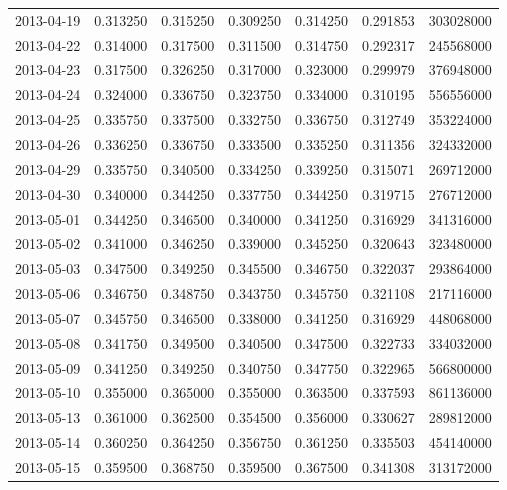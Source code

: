 \begin{tabular}{lrrrrrr}
2013-04-19 &    0.313250 &    0.315250 &    0.309250 &    0.314250 &    0.291853 &   303028000 \\
2013-04-22 &    0.314000 &    0.317500 &    0.311500 &    0.314750 &    0.292317 &   245568000 \\
2013-04-23 &    0.317500 &    0.326250 &    0.317000 &    0.323000 &    0.299979 &   376948000 \\
2013-04-24 &    0.324000 &    0.336750 &    0.323750 &    0.334000 &    0.310195 &   556556000 \\
2013-04-25 &    0.335750 &    0.337500 &    0.332750 &    0.336750 &    0.312749 &   353224000 \\
2013-04-26 &    0.336250 &    0.336750 &    0.333500 &    0.335250 &    0.311356 &   324332000 \\
2013-04-29 &    0.335750 &    0.340500 &    0.334250 &    0.339250 &    0.315071 &   269712000 \\
2013-04-30 &    0.340000 &    0.344250 &    0.337750 &    0.344250 &    0.319715 &   276712000 \\
2013-05-01 &    0.344250 &    0.346500 &    0.340000 &    0.341250 &    0.316929 &   341316000 \\
2013-05-02 &    0.341000 &    0.346250 &    0.339000 &    0.345250 &    0.320643 &   323480000 \\
2013-05-03 &    0.347500 &    0.349250 &    0.345500 &    0.346750 &    0.322037 &   293864000 \\
2013-05-06 &    0.346750 &    0.348750 &    0.343750 &    0.345750 &    0.321108 &   217116000 \\
2013-05-07 &    0.345750 &    0.346500 &    0.338000 &    0.341250 &    0.316929 &   448068000 \\
2013-05-08 &    0.341750 &    0.349500 &    0.340500 &    0.347500 &    0.322733 &   334032000 \\
2013-05-09 &    0.341250 &    0.349250 &    0.340750 &    0.347750 &    0.322965 &   566800000 \\
2013-05-10 &    0.355000 &    0.365000 &    0.355000 &    0.363500 &    0.337593 &   861136000 \\
2013-05-13 &    0.361000 &    0.362500 &    0.354500 &    0.356000 &    0.330627 &   289812000 \\
2013-05-14 &    0.360250 &    0.364250 &    0.356750 &    0.361250 &    0.335503 &   454140000 \\
2013-05-15 &    0.359500 &    0.368750 &    0.359500 &    0.367500 &    0.341308 &   313172000 \\

\end{tabular}
